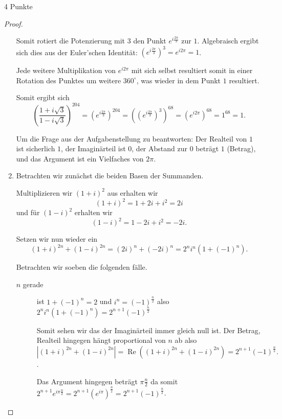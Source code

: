 \documentclass{problemset}
\begin{document}
\begin{problem}{4 Punkte}
\begin{proof}
\begin{enumerate}
		      Somit rotiert die Potenzierung mit $3$ den Punkt $e^{i\frac{2 \pi }{3}}$ zur
		      $1$. Algebraisch ergibt sich dies aus der Euler'schen Identität: $({e^{i\frac{2
								      \pi }{3}}})^3 = e^{i2\pi} = 1$.

		      Jede weitere Multiplikation von $e^{i2\pi}$ mit sich selbst resultiert somit in
		      einer Rotation des Punktes um weitere $360^\circ$, was wieder in dem Punkt $1$
		      resultiert.

		      Somit ergibt sich
		      \[
			      {\left(\frac{1+i\sqrt{3}}{1-i\sqrt{3}}\right)}^{204}
			      = {(e^{i\frac{2 \pi }{3}} )}^{204}
				      = {({(e^{i\frac{2 \pi }{3}} )}^3)}^{68}
				      = {(e^{i2\pi})}^{68}
				      = 1^{68}
			      = 1.
		      \]

		      Um die Frage aus der Aufgabenstellung zu beantworten: Der Realteil von $1$ ist
		      sicherlich $1$, der Imaginärteil ist $0$, der Abstand zur $0$ beträgt $1$
		      (Betrag), und das Argument ist ein Vielfaches von $2\pi$.

		\item Betrachten wir zunächst die beiden Basen der Summanden.

		      Multiplizieren wir ${(1 + i)}^2$ aus erhalten wir \[
			      {(1 + i)}^2 = 1 + 2i + i^2 = 2i
		      \] und für ${(1 - i)}^2$ erhalten wir \[
			      {(1 - i)}^2 = 1 - 2i + i^2 = -2i.
		      \]

		      Setzen wir nun wieder ein
		      \[
			      (1 + i)^{2n} + (1 - i)^{2n} = {(2i)}^n + {(-2i)}^n = 2^ni^n(1+ {(-1)}^n).
		      \]

		      Betrachten wir soeben die folgenden fälle.

		      \begin{description}
			      \item[$n$ gerade]
			            ist $1+ {(-1)}^n = 2$ und $i^n = {(-1)}^\frac{n}{2}$ also $2^ni^n(1+ {(-1)}^n) = 2^{n+1}{(-1)}^{\frac{n}{2}}$

			            Somit sehen wir das der Imaginärteil immer gleich null ist. Der Betrag,
			            Realteil hingegen hängt proportional von $n$ ab also \[
				            |(1 + i)^{2n} + (1 - i)^{2n}|  = \operatorname{Re}((1 + i)^{2n} + (1 - i)^{2n}) = 2^{n+1}{(-1)}^{\frac{n}{2}}.
			            \].

			            Das Argument hingegen beträgt $\pi \frac{n}{2}$ da somit $2^{n+1}
				            e^{i\pi\frac{n}{2}} = 2^{n+1} {(e^{i\pi})}^\frac{n}{2} =
				            2^{n+1}{(-1)}^{\frac{n}{2}}$.


\end{description}
\end{enumerate}
\end{proof}
\end{problem}
\end{document}

